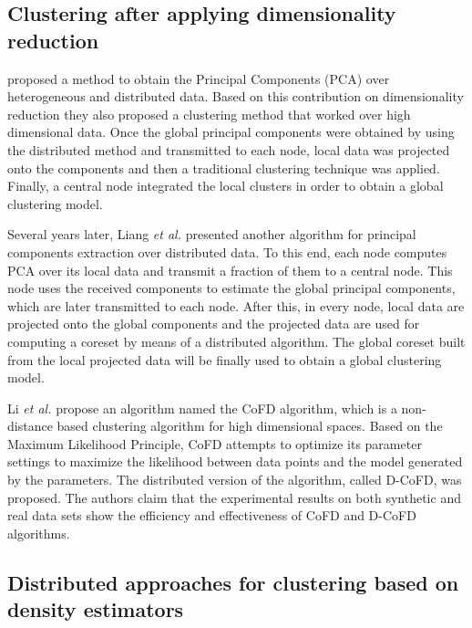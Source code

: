 \documentclass[10pt]{article}
\begin{document}
\subsection{Clustering after applying dimensionality reduction}

\citep{KHSJ01} proposed a method to obtain the Principal Components (PCA) over heterogeneous and distributed data. Based on this contribution on dimensionality reduction they also proposed a clustering method that worked over high dimensional data. Once the global principal components were obtained by using the distributed method and transmitted to each node, local data was projected onto the components and then a traditional clustering technique was applied. Finally, a central node
integrated the local clusters in order to obtain a global clustering model.

Several years later, Liang \textit{et al.} \citep{LBK13} presented another algorithm for principal components extraction over distributed data. To this end, each node computes PCA over its local data and transmit a fraction of them to a central node. This node uses the received components to estimate the global principal components, which are later transmitted to each node. After this, in every node, local data are projected onto the global components and the projected data are used for computing a coreset by means of a distributed algorithm. The global coreset built from the local projected data will be finally used to obtain a global clustering model.  

Li \textit{et al.} \citep{LZO03} propose an algorithm named the CoFD algorithm, which is a non-distance based clustering algorithm for high dimensional spaces. Based on the Maximum Likelihood Principle, CoFD attempts to optimize its parameter settings to maximize the likelihood between data points and the model generated by the parameters. The distributed version of the algorithm, called D-CoFD, was proposed. The authors claim that the experimental results on both synthetic and real data sets show the efficiency and effectiveness of CoFD and D-CoFD algorithms.

\subsection{Distributed approaches for clustering based on density estimators}\label{sec:sa_dens}
\end{document}
